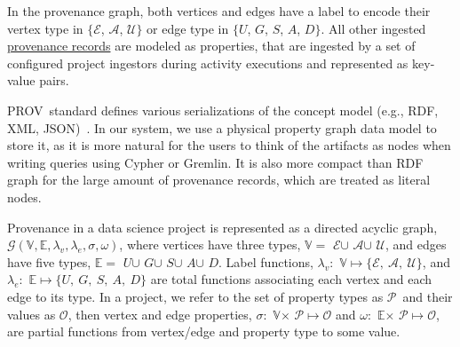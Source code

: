 \documentclass[11pt]{article}
\newcommand{\prov}{{\sc PROV}\xspace}
\newcommand{\eat}[1]{}
\newcommand{\vertexset}{$\mathbb V$}
\newcommand{\edgeset}{$\mathbb E$}
\newcommand{\entity}{$\mathcal E$}
\newcommand{\activity}{$\mathcal A$}
\newcommand{\agent}{$\mathcal U$}
\newcommand{\used}{$\mathit U$}
\newcommand{\wasGeneratedBy}{$\mathit G$}
\newcommand{\wasAssociatedWith}{$\mathit S$}
\newcommand{\wasAttributedTo}{$\mathit A$}
\newcommand{\wasDerivedFrom}{$\mathit D$}
\newcommand{\vlabelfunc}{$\lambda_v$}
\newcommand{\elabelfunc}{$\lambda_e$}
\newcommand{\property}{$\mathcal P$}
\newcommand{\vpropfunc}{$\sigma$}
\newcommand{\epropfunc}{$\omega$}
\newcommand{\provgraph}{$\mathcal G$}
\begin{document}
In the provenance graph, both vertices and edges have a label to encode their vertex type in $\{$\entity, \activity, \agent$\}$ or edge type in $\{$\used,
   \wasGeneratedBy, \wasAssociatedWith, \wasAttributedTo, \wasDerivedFrom$\}$. All other ingested \ul{provenance records} are modeled as properties, that are ingested by a set
   of configured project ingestors during activity executions and represented as key-value pairs. 


\prov\ standard defines various serializations of the concept model (e.g., RDF, XML, JSON)~\cite{prov_stack@w3c_tr13}. In our system, we use a physical property graph
data model to store it, as it is more natural for the users to think of the artifacts as nodes when writing queries using Cypher or Gremlin. It is also more compact than RDF graph for the large amount of provenance records, which are treated as literal nodes.

\begin{definition}
\label{def:provgraph}
Provenance in a data science project is represented as a directed acyclic graph, $\text{\provgraph}(\text{\vertexset}, \text{\edgeset}, \text{\vlabelfunc}, \text{\elabelfunc}, \text{\vpropfunc},\text{\epropfunc})$, where vertices have three types, \vertexset $=$ \entity $\cup$ \activity $\cup$ \agent, and edges have five types, \edgeset $=$ \used $\cup$ \wasGeneratedBy $\cup$ \wasAssociatedWith $\cup$ \wasAttributedTo $\cup$ \wasDerivedFrom. Label functions, \vlabelfunc $:$ \vertexset $\mapsto \{$\entity$,\ $\activity$,\ $\agent$\}$, and \elabelfunc $:$ \edgeset $\mapsto \{$\used$,\ $\wasGeneratedBy$,\ $\wasAssociatedWith$,\ $\wasAttributedTo$,\ $\wasDerivedFrom$\}$ are total functions associating each vertex and each edge to its type. In a project, we refer to the set of property types as \property\ and their values as $\mathcal O$, then vertex and edge properties, \vpropfunc $:$ \vertexset $\times $ \property $\mapsto \mathcal O$ and \eat{edge properties }\epropfunc $:$ \edgeset $\times $ \property $\mapsto \mathcal O$, are partial functions from vertex/edge and property type to some value.
\end{definition}
\end{document}
